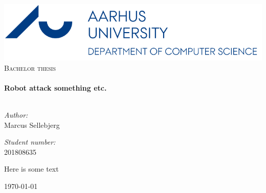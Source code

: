 \begin{titlepage}
\begin{center}

\includegraphics[width=1\textwidth]{img/AUlogo}\\[0.4cm]
\textsc{\Large Bachelor thesis}\\[0.5cm]

\HRule \\[0.4cm]
{ \huge \bfseries Robot attack something etc.}\\[0.4cm]
\HRule \\[0.4cm]

\begin{minipage}{0.4\textwidth}
\begin{flushleft} \large
\emph{Author:}\\
Marcus Sellebjerg
\end{flushleft}
\end{minipage}
\begin{minipage}{0.4\textwidth}
\begin{flushright} \large
\emph{Student number:} \\
201808635
\end{flushright}
\end{minipage}
\vspace{10mm}
\begin{center}
    Here is some text
\end{center}
\vfill
{\large \today}
\end{center}
\end{titlepage}